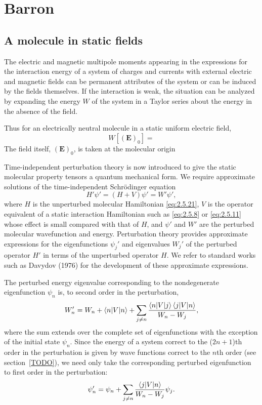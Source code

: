 \documentclass[%
class = book,%
crop = false,%
float = true,%
multi = true,%
preview = false,%
]{standalone}
\begin{document}
\section{Barron}
\subsection{A molecule in static fields}
The electric and magnetic multipole moments appearing in the expressions for the interaction energy of a system of charges and currents with external electric and magnetic fields can be permanent attributes of the system or can be induced by the fields themselves. If the interaction is weak, the situation can be analyzed by expanding the energy \(W\) of the system in a Taylor series about the energy in the absence of the field.

Thus for an electrically neutral molecule in a static uniform electric field,
\begin{equation}
  \label{eq:2.6.1}
  W[(\mathbf{E})_{0}] =
\end{equation}
The field itself, \((\mathbf{E})_{0}\), is taken at the molecular origin

Time-independent perturbation theory is now introduced to give the static molecular property tensors a quantum mechanical form. We require approximate solutions of the time-independent Schr{\"{o}}dinger equation
\begin{equation}
  \label{eq:2.6.12}
  H' \psi ' = (H + V) \psi ' = W' \psi ',
\end{equation}
where \(H\) is the unperturbed molecular Hamiltonian \eqref{eq:2.5.21}, \(V\) is the operator equivalent of a static interaction Hamiltonian such as \eqref{eq:2.5.8} or \eqref{eq:2.5.11} whose effect is small compared with that of \(H\), and \(\psi '\) and \(W'\) are the perturbed molecular wavefunction and energy. Perturbation theory provides approximate expressions for the eigenfunctions \(\psi_{j}'\) and eigenvalues \(W_{j}'\) of the perturbed operator \(H'\) in terms of the unperturbed operator \(H\). We refer to standard works such as Davydov (1976) for the development of these approximate expressions.

The perturbed energy eigenvalue corresponding to the nondegenerate eigenfunction \(\psi_{n}\) is, to second order in the perturbation,
\begin{equation}
  \label{eq:2.6.13}
  W_{n}' = W_{n} + \braket{n|V|n} + \sum_{j \neq n} \frac{\braket{n|V|j}\braket{j|V|n}}{W_{n} - W_{j}},
\end{equation}
where the sum extends over the complete set of eigenfunctions with the exception of the initial state \(\psi_{n}\). Since the energy of a system correct to the (\(2n + 1\))th order in the perturbation is given by wave functions correct to the \(n\)th order (see section~\ref{TODO}), we need only take the corresponding perturbed eigenfunction to first order in the perturbation:
\begin{equation}
  \label{eq:2.6.14}
  \psi_{n}' = \psi_{n} + \sum_{j \neq n} \frac{\braket{j|V|n}}{W_{n} - W_{j}} \psi_{j}.
\end{equation}
\end{document}
